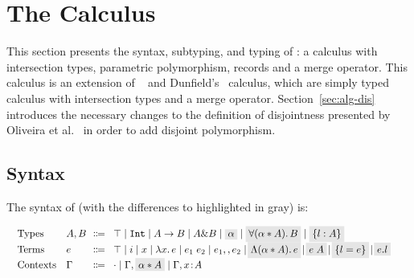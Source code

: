 \section{The \name Calculus}\label{sec:fi}
This section presents the syntax, subtyping, and typing of \name: 
a calculus with intersection types, parametric polymorphism, records and a merge operator. 
This calculus is an extension of \oldname~\cite{oliveira16disjoint} and Dunfield's~\cite{dunfield2014elaborating}
calculus, which are simply typed
calculus with intersection types and a merge operator.
Section~\ref{sec:alg-dis} introduces the necessary changes to the
definition of disjointness presented by Oliveira et al.~\cite{oliveira16disjoint} in
order to add disjoint polymorphism.


\subsection{Syntax}
The syntax of \name (with the differences to \oldname highlighted in gray) is: 

\vspace{-15pt}
  \[
    \begin{array}{l}
      \begin{array}{llrll}
        \text{Types}
        & A, B & \!\!\Coloneqq & \!\top \mid \tyint \mid A \to B \mid A
                             \inter B \mid \highlight{$\alpha$} \mid \highlight{$\fordis \alpha A B$} \mid \highlight{$\recordType l A$} & \\ 

        \text{Terms}
        & e & \!\!\Coloneqq & \!\top \mid i \mid x \mid \lamty x A e \mid \app {e_1} {e_2} 
              \mid e_1 \mergeop e_2 \mid \!\highlight{$\blamdis \alpha A e$} \!\mid \!\highlight{$\tapp e A$} \!\mid 
              \!\highlight{$\recordCon l e$} \!\mid \!\highlight{$\recordProj e l$} & \\
        \text{Contexts}
        & \Gamma & \!\!\Coloneqq & \!\cdot
                   \mid \Gamma, \highlight{$\alpha \disjoint A$}
                   \mid \Gamma, x \oftype A  & \\
      \end{array}
    \end{array}
  \]

